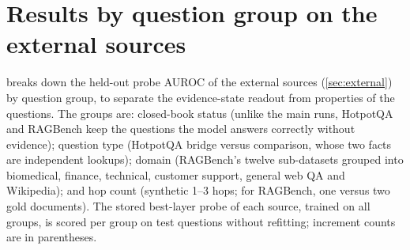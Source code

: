 \section{Results by question group on the external sources}
\label{app:groups}
 breaks down the held-out probe AUROC of the external sources (\cref{sec:external}) by question group, to separate the evidence-state readout from properties of the questions. The groups are: closed-book status (unlike the main runs, HotpotQA and RAGBench keep the questions the model answers correctly without evidence); question type (HotpotQA bridge versus comparison, whose two facts are independent lookups); domain (RAGBench's twelve sub-datasets grouped into biomedical, finance, technical, customer support, general web QA and Wikipedia); and hop count (synthetic 1--3 hops; for RAGBench, one versus two gold documents). The stored best-layer probe of each source, trained on all groups, is scored per group on test questions without refitting; increment counts are in parentheses.
\begin{table}[h]
\centering\scriptsize

\caption{Held-out probe AUROC by question group (test-set increment counts in parentheses): closed-book status, question type, domain and hop count.}
\label{tab:groups}
\end{table}
